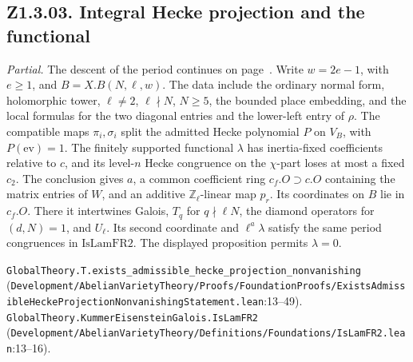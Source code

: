\subsection{Z1.3.03. Integral Hecke projection and the functional}
\label{r5:small:Z1.3.03}
\textit{Partial.} The descent of the period continues on page~\pageref{r6:Z1.3.03}. Write $w=2e-1$, with $e\ge1$, and $B=X.B(N,\ell,w)$. The data include the ordinary normal form, holomorphic tower, $\ell\ne2$, $\ell\nmid N$, $N\ge5$, the bounded place embedding, and the local formulas for the two diagonal entries and the lower-left entry of $\rho$. The compatible maps $\pi_i,\sigma_i$ split the admitted Hecke polynomial $P$ on $V_B$, with $P(\mathrm{ev})=1$. The finitely supported functional $\lambda$ has inertia-fixed coefficients relative to $c$, and its level-$n$ Hecke congruence on the $\chi$-part loses at most a fixed $c_2$. The conclusion gives $a$, a common coefficient ring $c_f.O\supset c.O$ containing the matrix entries of $W$, and an additive $\mathbb Z_\ell$-linear map $p_r$. Its coordinates on $B$ lie in $c_f.O$. There it intertwines Galois, $T_q$ for $q\nmid\ell N$, the diamond operators for $(d,N)=1$, and $U_\ell$. Its second coordinate and $\ell^a\lambda$ satisfy the same period congruences in $\mathrm{IsLamFR2}$. The displayed proposition permits $\lambda=0$.
\par{\footnotesize \nolinkurl{GlobalTheory.T.exists_admissible_hecke_projection_nonvanishing} (\nolinkurl{Development/AbelianVarietyTheory/Proofs/FoundationProofs/ExistsAdmissibleHeckeProjectionNonvanishingStatement.lean}\allowbreak:13--49). \nolinkurl{GlobalTheory.KummerEisensteinGalois.IsLamFR2} (\nolinkurl{Development/AbelianVarietyTheory/Definitions/Foundations/IsLamFR2.lean}\allowbreak:13--16).\par}

